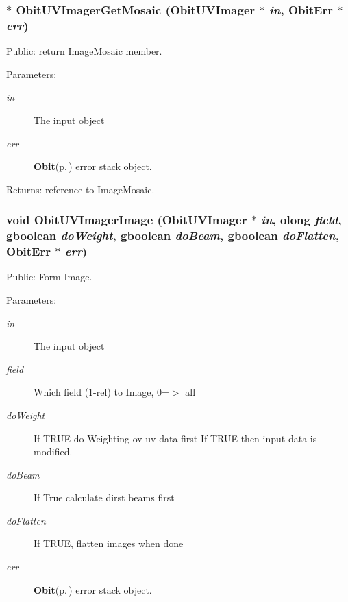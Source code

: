 \subsubsection{$\ast$ Obit\-UVImager\-Get\-Mosaic ({\bf Obit\-UVImager} $\ast$ {\em in}, {\bf Obit\-Err} $\ast$ {\em err})}\label{ObitUVImager_8h_a22}


Public: return Image\-Mosaic member. 

\begin{Desc}
\item[Parameters:]
\begin{description}
\item[{\em in}]The input object \item[{\em err}]{\bf Obit}{\rm (p.\,\pageref{structObit})} error stack object. \end{description}
\end{Desc}
\begin{Desc}
\item[Returns:]reference to Image\-Mosaic. \end{Desc}
\subsubsection{\setlength{\rightskip}{0pt plus 5cm}void Obit\-UVImager\-Image ({\bf Obit\-UVImager} $\ast$ {\em in}, {\bf olong} {\em field}, gboolean {\em do\-Weight}, gboolean {\em do\-Beam}, gboolean {\em do\-Flatten}, {\bf Obit\-Err} $\ast$ {\em err})}\label{ObitUVImager_8h_a20}


Public: Form Image. 

\begin{Desc}
\item[Parameters:]
\begin{description}
\item[{\em in}]The input object \item[{\em field}]Which field (1-rel) to Image, 0=$>$ all \item[{\em do\-Weight}]If TRUE do Weighting ov uv data first If TRUE then input data is modified. \item[{\em do\-Beam}]If True calculate dirst beams first \item[{\em do\-Flatten}]If TRUE, flatten images when done \item[{\em err}]{\bf Obit}{\rm (p.\,\pageref{structObit})} error stack object. \end{description}
\end{Desc}
